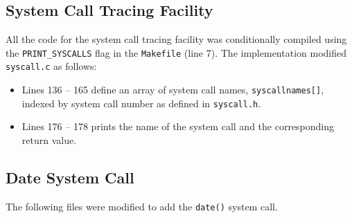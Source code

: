 \documentclass[11pt,letterpaper]{report}
\begin{document}
	\subsection*{System Call Tracing Facility}
	All the code for the system call tracing facility was conditionally compiled using the {\tt PRINT\_SYSCALLS} flag in the {\tt Makefile} ({\color{red}line 7}). The implementation modified  {\tt syscall.c} as follows:
	\begin{itemize}

	\item {\color{red}Lines 136 -- 165} define an array of system call names, {\tt syscallnames[]}, indexed by system call number as defined in {\tt syscall.h}.
	
	\item {\color{red}Lines 176 -- 178 } prints the name of the  system call and the corresponding return value.
	
	\end{itemize}	
	
	\subsection*{Date System Call}
	The following files were modified to add the {\tt date()} system call.
	
\end{document}
